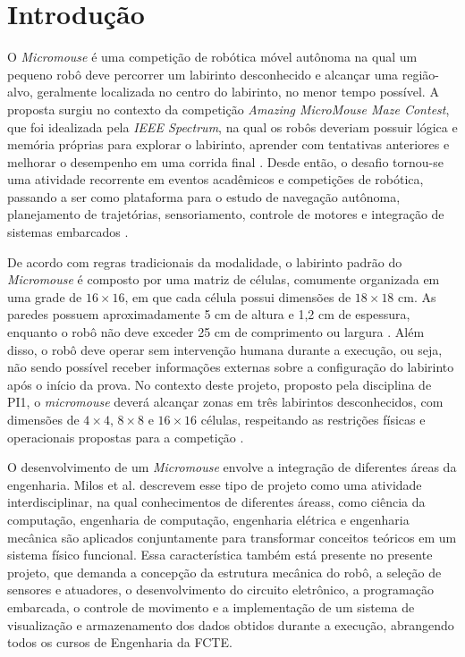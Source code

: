\chapter[Introdução]{Introdução}

O \textit{Micromouse} é uma competição de robótica móvel autônoma na qual um pequeno robô deve percorrer um labirinto desconhecido e alcançar uma região-alvo, geralmente localizada no centro do labirinto, no menor tempo possível. A proposta surgiu no contexto da competição \textit{Amazing MicroMouse Maze Contest}, que foi idealizada pela \textit{IEEE Spectrum}, na qual os robôs deveriam possuir lógica e memória próprias para explorar o labirinto, aprender com tentativas anteriores e melhorar o desempenho em uma corrida final \cite{christiansen2014amazing}. Desde então, o desafio tornou-se uma atividade recorrente em eventos acadêmicos e competições de robótica, passando a ser como plataforma para o estudo de navegação autônoma, planejamento de trajetórias, sensoriamento, controle de motores e integração de sistemas embarcados \cite{milos2010undergraduate}.

De acordo com regras tradicionais da modalidade, o labirinto padrão do \textit{Micromouse} é composto por uma matriz de células, comumente organizada em uma grade de $16 \times 16$, em que cada célula possui dimensões de $18 \times 18$ cm. As paredes possuem aproximadamente 5 cm de altura e 1,2 cm de espessura, enquanto o robô não deve exceder 25 cm de comprimento ou largura \cite{ieeerhu2024micromouse}. Além disso, o robô deve operar sem intervenção humana durante a execução, ou seja, não sendo possível receber informações externas sobre a configuração do labirinto após o início da prova. No contexto deste projeto, proposto pela disciplina de PI1, o \textit{micromouse} deverá alcançar zonas em três labirintos desconhecidos, com dimensões de $4 \times 4$, $8 \times 8$ e $16 \times 16$ células, respeitando as restrições físicas e operacionais propostas para a competição \cite{garcia2026tema}.

O desenvolvimento de um \textit{Micromouse} envolve a integração de diferentes áreas da engenharia. Milos et al. \cite{milos2010undergraduate} descrevem esse tipo de projeto como uma atividade interdisciplinar, na qual conhecimentos de diferentes áreass, como ciência da computação, engenharia de computação, engenharia elétrica e engenharia mecânica são aplicados conjuntamente para transformar conceitos teóricos em um sistema físico funcional. Essa característica também está presente no presente projeto, que demanda a concepção da estrutura mecânica do robô, a seleção de sensores e atuadores, o desenvolvimento do circuito eletrônico, a programação embarcada, o controle de movimento e a implementação de um sistema de visualização e armazenamento dos dados obtidos durante a execução, abrangendo todos os cursos de Engenharia da FCTE.

